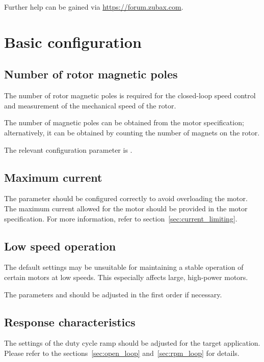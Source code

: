\documentclass{zubaxdoc}
\begin{document}
Further help can be gained via \url{https://forum.zubax.com}.

\section{Basic configuration}\label{sec:basic-configuration}

\subsection{Number of rotor magnetic poles}

The number of rotor magnetic poles is required for the closed-loop speed control and
measurement of the mechanical speed of the rotor.

The number of magnetic poles can be obtained from the motor specification;
alternatively, it can be obtained by counting the number of magnets on the rotor.

The relevant configuration parameter is .

\subsection{Maximum current}

The parameter  should be configured correctly to avoid overloading the motor.
The maximum current allowed for the motor should be provided in the motor specification.
For more information, refer to section~\ref{sec:current_limiting}.

\subsection{Low speed operation}

The default settings may be unsuitable for maintaining a stable operation of certain motors at low speeds.
This especially affects large, high-power motors.

The parameters  and  should be adjusted in the first
order if necessary.

\subsection{Response characteristics}

The settings of the duty cycle ramp should be adjusted for the target application.
Please refer to the sections~\ref{sec:open_loop} and~\ref{sec:rpm_loop} for details.
\end{document}
